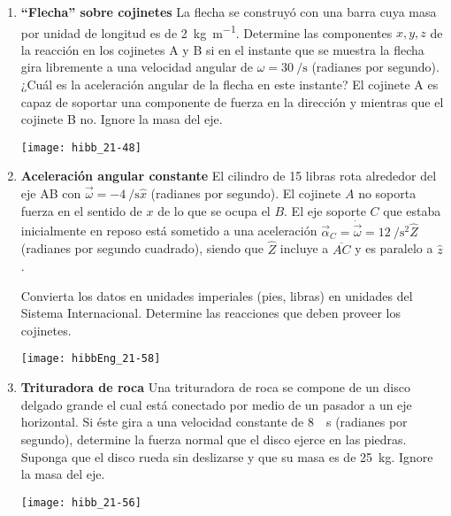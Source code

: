 \documentclass[11pt, spanish, a4paper, twoside]{article}
\begin{document}
\begin{enumerate}
	\item 
	\begin{minipage}[t][4.5cm]{0.55\textwidth}
		\textbf{``Flecha'' sobre cojinetes}
		La flecha se construyó con una barra cuya masa por unidad de longitud es de \SI{2}{\kilo\gram\per\metre}.
		Determine las componentes \(x, y, z\) de la reacción en los cojinetes A y B si en el instante que se muestra la flecha gira libremente a una velocidad angular de \(\omega = \SI{30}{\per\second}\) (radianes por segundo).
		¿Cuál es la aceleración angular de la flecha en este instante?
		El cojinete A es capaz de soportar una componente de fuerza en la dirección y mientras que el cojinete B no.
		Ignore la masa del eje.
	\end{minipage}
	\begin{minipage}[c][0cm][t]{0.4\textwidth}
		\texttt{[image: hibb\_21-48]}
	\end{minipage}


	\item 
	\begin{minipage}[t][6.5cm]{0.65\textwidth}
		\textbf{Aceleración angular constante}
		El cilindro de 15 libras rota alrededor del eje AB con \(\vec{\omega} = -\SI{4}{\per\second} \hat{x}\) (radianes por segundo).
	El cojinete \(A\) no soporta fuerza en el sentido de \(x\) de lo que se ocupa el \(B\).
	El eje soporte \(C\) que estaba inicialmente en reposo está sometido a una aceleración \(\vec{\alpha}_C = \dot{\vec{\omega}} = \SI{12}{\per\second\squared} \hat{Z}\) (radianes por segundo cuadrado), siendo que \(\hat{Z}\) incluye a \(\overline{AC}\) y es paralelo a \(\hat{z}\).
	\begin{tasks}
		\task Convierta los datos en unidades imperiales (pies, libras) en unidades del Sistema Internacional.
		\task Determine las reacciones que deben proveer los cojinetes.
	\end{tasks}
	\end{minipage}
	\begin{minipage}[c][2cm][t]{0.3\textwidth}
		\texttt{[image: hibbEng\_21-58]}
	\end{minipage}


	\item 
	\begin{minipage}[t][3.5cm]{0.65\textwidth}
		\textbf{Trituradora de roca}
		Una trituradora de roca se compone de un disco delgado grande el cual está conectado por medio de un pasador a un eje horizontal.
		Si éste gira a una velocidad constante de \SI{8}{\per\second} (radianes por segundo), determine la fuerza normal que el disco ejerce en las piedras.
		Suponga que el disco rueda sin deslizarse y que su masa es de \SI{25}{\kilo\gram}.
		Ignore la masa del eje.
	\end{minipage}
	\begin{minipage}[c][2cm][t]{0.3\textwidth}
		\texttt{[image: hibb\_21-56]}
	\end{minipage}


\end{enumerate}
\end{document}
